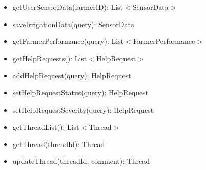 \documentclass[10pt]{article} %
\begin{document}
\begin{itemize}
\begin{itemize}
        \item getUserSensorData(farmerID): List$<$SensorData$>$
        \item saveIrrigationData(query): SensorData
        \item getFarmerPerformance(query): List$<$FarmerPerformance$>$
        \item getHelpRequests(): List$<$HelpRequest$>$
        \item addHelpRequest(query): HelpRequest
        \item setHelpRequestStatus(query): HelpRequest
        \item setHelpRequestSeverity(query): HelpRequest
        \item getThreadList(): List$<$Thread$>$
        \item getThread(threadId): Thread
        \item updateThread(threadId, comment): Thread
    \end{itemize}
\end{itemize}
\end{document}
